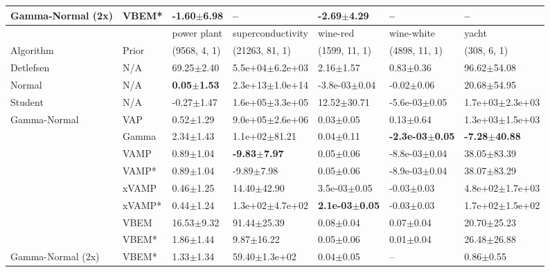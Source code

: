 \begin{tabular}{lllllll}
Gamma-Normal (2x) & VBEM* &           -1.60$\pm$6.98 &                            -- &           -2.69$\pm$4.29 &                        -- &                           -- \\
\midrule
                  &       &             power plant &        superconductivity &                   wine-red &                  wine-white &                     yacht \\
Algorithm & Prior& (9568, 4, 1)& (21263, 81, 1)& (1599, 11, 1)& (4898, 11, 1)& (308, 6, 1)\\
\midrule
Detlefsen & N/A &          69.25$\pm$2.40 &      5.5e+04$\pm$6.2e+03 &              2.16$\pm$1.57 &               0.83$\pm$0.36 &           96.62$\pm$54.08 \\
Normal & N/A &  \textbf{0.05$\pm$1.53} &      2.3e+13$\pm$1.0e+14 &          -3.8e-03$\pm$0.04 &              -0.02$\pm$0.06 &           20.68$\pm$54.95 \\
Student & N/A &          -0.27$\pm$1.47 &      1.6e+05$\pm$3.3e+05 &            12.52$\pm$30.71 &           -5.6e-03$\pm$0.05 &       1.7e+03$\pm$2.3e+03 \\
Gamma-Normal & VAP &           0.52$\pm$1.29 &      9.0e+05$\pm$2.6e+06 &              0.03$\pm$0.05 &               0.13$\pm$0.64 &       1.3e+03$\pm$1.5e+03 \\
                  & Gamma &           2.34$\pm$1.43 &        1.1e+02$\pm$81.21 &              0.04$\pm$0.11 &  \textbf{-2.3e-03$\pm$0.05} &  \textbf{-7.28$\pm$40.88} \\
                  & VAMP &           0.89$\pm$1.04 &  \textbf{-9.83$\pm$7.97} &              0.05$\pm$0.06 &           -8.8e-03$\pm$0.04 &           38.05$\pm$83.39 \\
                  & VAMP* &           0.89$\pm$1.04 &           -9.89$\pm$7.98 &              0.05$\pm$0.06 &           -8.9e-03$\pm$0.04 &           38.07$\pm$83.29 \\
                  & xVAMP &           0.46$\pm$1.25 &          14.40$\pm$42.90 &           3.5e-03$\pm$0.05 &              -0.03$\pm$0.03 &       4.8e+02$\pm$1.7e+03 \\
                  & xVAMP* &           0.44$\pm$1.24 &      1.3e+02$\pm$4.7e+02 &  \textbf{2.1e-03$\pm$0.05} &              -0.03$\pm$0.03 &       1.7e+02$\pm$1.5e+02 \\
                  & VBEM &          16.53$\pm$9.32 &          91.44$\pm$25.39 &              0.08$\pm$0.04 &               0.07$\pm$0.04 &           20.70$\pm$25.23 \\
                  & VBEM* &           1.86$\pm$1.44 &           9.87$\pm$16.22 &              0.05$\pm$0.06 &               0.01$\pm$0.04 &           26.48$\pm$26.88 \\
Gamma-Normal (2x) & VBEM* &           1.33$\pm$1.34 &        59.40$\pm$1.3e+02 &              0.04$\pm$0.05 &                         -- &             0.86$\pm$0.55 \\
\bottomrule
\end{tabular}

